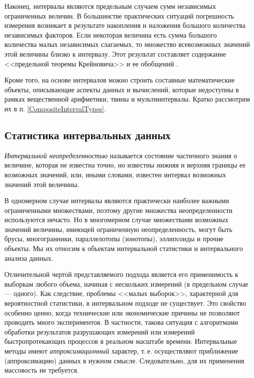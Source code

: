 \documentclass[a5paper,openany]{book}
\begin{document}
{{Наконец, интервалы являются предельным случаем сумм независимых ограниченных величин. 
В большинстве практических ситуаций погрешность измерения возникает в результате 
накопления и наложения большого количества независимых факторов. 
Если некоторая величина есть сумма большого количества малых независимых слагаемых, 
то множество всевозможных значений этой величины близко к интервалу.
Этот результат составляет содержание <<предельной 
теоремы Крейновича>> и ее обобщений \cite{SSharyBook}.

Кроме того, на основе интервалов можно строить составные математические объекты, описывающие аспекты данных и вычислений, которые недоступны в рамках вещественной арифметики, твины и мультиинтервалы. Кратко рассмотрим их в п. \ref{CompositeIntervalTypes}.

\subsection{Статистика интервальных данных} 
\label{InteStatistiSect}    


\textit{Интервальной неопределенностью} называется состояние частичного знания 
о величине, которая не известна точно, но известны нижняя и верхняя границы ее возможных 
значений, или, иными словами, известен интервал 
возможных значений этой величины. 

В одномерном случае интервалы являются практически наиболее важными ограниченными 
множествами, поэтому другие множества неопределенности используются нечасто. Но 
в многомерном случае множествами возможных значений величины, имеющей ограниченную 
неопределенность, могут быть брусы, многогранники, параллелотопы (зонотопы), 
эллипсоиды и прочие объекты. Мы их  относим к объектам интервальной 
статистики и интервального анализа данных. 

Отличительной чертой представляемого подхода является его применимость 
к выборкам любого объема, начиная с нескольких измерений (в предельном случае --- 
одного). Как следствие, проблемы <<малых выборок>>, характерной для вероятностной 
статистики, в интервальном подходе не существует. Это свойство особенно 
ценно, когда технические или экономические причины не позволяют проводить 
много экспериментов. В частности, такова ситуация с алгоритмами обработки результатов 
разрушающих измерений или измерений быстропротекающих процессов в реальном масштабе 
времени. 
Интервальные методы имеют 
\emph{аппроксимационный} характер, т.\,е. осуществляют приближение (аппроксимацию) 
данных в нужном смысле. Следовательно, для их применения  массовость не требуется.   


}}
\end{document}
